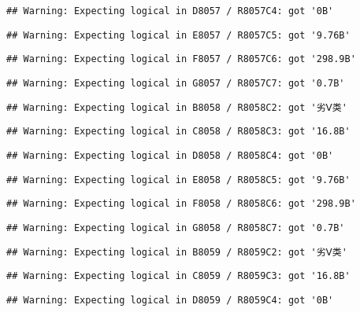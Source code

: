 \documentclass[
]{article}
\begin{document}
\begin{verbatim}
## Warning: Expecting logical in D8057 / R8057C4: got '0B'
\end{verbatim}

\begin{verbatim}
## Warning: Expecting logical in E8057 / R8057C5: got '9.76B'
\end{verbatim}

\begin{verbatim}
## Warning: Expecting logical in F8057 / R8057C6: got '298.9B'
\end{verbatim}

\begin{verbatim}
## Warning: Expecting logical in G8057 / R8057C7: got '0.7B'
\end{verbatim}

\begin{verbatim}
## Warning: Expecting logical in B8058 / R8058C2: got '劣Ⅴ类'
\end{verbatim}

\begin{verbatim}
## Warning: Expecting logical in C8058 / R8058C3: got '16.8B'
\end{verbatim}

\begin{verbatim}
## Warning: Expecting logical in D8058 / R8058C4: got '0B'
\end{verbatim}

\begin{verbatim}
## Warning: Expecting logical in E8058 / R8058C5: got '9.76B'
\end{verbatim}

\begin{verbatim}
## Warning: Expecting logical in F8058 / R8058C6: got '298.9B'
\end{verbatim}

\begin{verbatim}
## Warning: Expecting logical in G8058 / R8058C7: got '0.7B'
\end{verbatim}

\begin{verbatim}
## Warning: Expecting logical in B8059 / R8059C2: got '劣Ⅴ类'
\end{verbatim}

\begin{verbatim}
## Warning: Expecting logical in C8059 / R8059C3: got '16.8B'
\end{verbatim}

\begin{verbatim}
## Warning: Expecting logical in D8059 / R8059C4: got '0B'
\end{verbatim}
\end{document}
